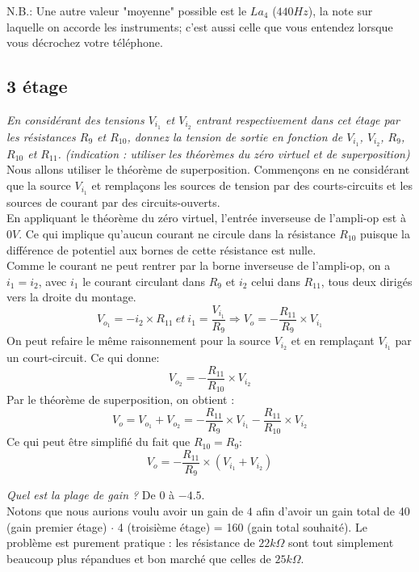 N.B.: Une autre valeur "moyenne" possible est le $La_4$ ($440Hz$), la note sur laquelle on accorde les instruments; c'est aussi celle que vous entendez lorsque vous décrochez votre téléphone.

\subsection{3 étage}

{
\textit{En considérant des tensions $V_{{i}_1}$ et $V_{{i}_2}$ entrant respectivement dans cet étage par les résistances $R_9$ et $R_{10}$, donnez la tension de sortie en fonction de $V_{{i}_1}$, $V_{{i}_2}$, $R_9$, $R_{10}$ et $R_{11}$. (indication : utiliser les théorèmes du zéro virtuel et de superposition)}
}
{%
Nous allons utiliser le théorème de superposition. Commençons en ne considérant que
la source $V_{{i}_1}$ et remplaçons les sources de tension par des courts-circuits et les sources de courant par des circuits-ouverts.\\

En appliquant le théorème du zéro virtuel, l'entrée inverseuse de l’ampli-op est à $0V$. Ce qui implique qu'aucun courant ne circule dans la résistance $R_{10}$ puisque la différence de potentiel aux bornes de cette résistance est nulle.\\
Comme le courant ne peut rentrer par la borne inverseuse de l’ampli-op, on a $i_1 = i_2$, avec $i_1$ le courant circulant dans $R_9$ et $i_2$ celui dans
$R_{11}$, tous deux dirigés vers la droite du montage.
$$V_{o_1}=-i_2\times R_{11}\ et\ i_1=\frac{V_{{i}_1}}{R_9} \Rightarrow V_o=-\frac{R_{11}}{R_9}\times V_{{i}_1}$$
On peut refaire le même raisonnement pour la source $V_{{i}_2}$ et en remplaçant $V_{{i}_1}$ par un court-circuit. Ce qui donne:
$$V_{o_2}=-\frac{R_{11}}{R_{10}}\times V_{{i}_2}$$
Par le théorème de superposition, on obtient :
$$V_o=V_{o_1}+V_{o_2}=-\frac{R_{11}}{R_9}\times V_{{i}_1}-\frac{R_{11}}{R_{10}}\times V_{{i}_2}$$
Ce qui peut être simplifié du fait que $R_{10} = R_9$:
$$V_o=-\frac{R_{11}}{R_9}\times (V_{{i}_1}+V_{{i}_2})$$
}

{
\textit{Quel est la plage de gain ?}
}
{%
De $0$ à $-4.5$.\\
Notons que nous aurions voulu avoir un gain de $4$ afin d'avoir un gain total de 40 (gain premier étage) $\cdot$ 4 (troisième étage) = 160 (gain total souhaité).
Le problème est purement pratique : les résistance de $22 k\Omega$ sont tout simplement beaucoup plus répandues et bon marché que celles de $25 k\Omega$.
}

